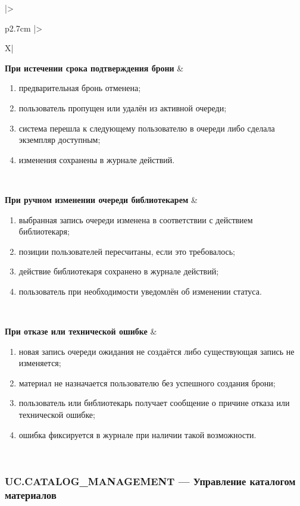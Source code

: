 \documentclass[12pt,a4paper]{article}
\begin{document}
\begin{xltabular}{\textwidth}{
				|>{\raggedright\arraybackslash}p{2.7cm}
				|>{\raggedright\arraybackslash}X|
			}
			\textbf{При истечении срока подтверждения брони} &
			\begin{enumerate}
				\item предварительная бронь отменена;
				\item пользователь пропущен или удалён из активной очереди;
				\item система перешла к следующему пользователю в очереди либо
				сделала экземпляр доступным;
				\item изменения сохранены в журнале действий.
			\end{enumerate} \\
			\hline
			
			\textbf{При ручном изменении очереди библиотекарем} &
			\begin{enumerate}
				\item выбранная запись очереди изменена в соответствии с действием
				библиотекаря;
				\item позиции пользователей пересчитаны, если это требовалось;
				\item действие библиотекаря сохранено в журнале действий;
				\item пользователь при необходимости уведомлён об изменении статуса.
			\end{enumerate} \\
			\hline
			
			\textbf{При отказе или технической ошибке} &
			\begin{enumerate}
				\item новая запись очереди ожидания не создаётся либо существующая
				запись не изменяется;
				\item материал не назначается пользователю без успешного создания
				брони;
				\item пользователь или библиотекарь получает сообщение о причине
				отказа или технической ошибке;
				\item ошибка фиксируется в журнале при наличии такой возможности.
			\end{enumerate} \\
			\hline
			
		\end{xltabular}
		
		\label{tab:uc-waitlist-specification}
		\clearpage
		
		\subsubsection{UC.CATALOG\_MANAGEMENT --- Управление каталогом материалов}
		
\end{document}
